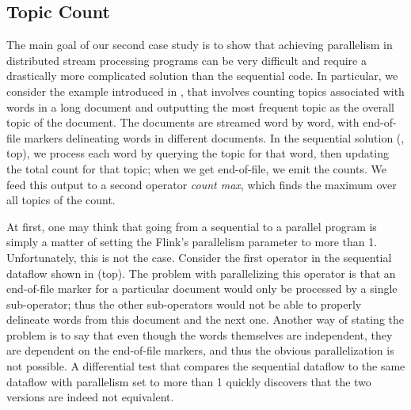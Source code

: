 \subsection{Topic Count}
\label{diffstream:ssec:evaluation-wordcount}

The main goal of our second case study is to show that achieving parallelism in distributed stream processing programs can be very difficult and require a drastically more complicated solution than the sequential code.
In particular, we consider the example introduced
in , that involves counting topics associated with words in a long document
and outputting the most frequent topic as the overall topic of the document.
The documents are streamed word by word, with end-of-file markers
delineating words in different documents.
In the sequential solution (, top), we process each word by querying the topic for that word, then updating the total count for that topic; when we get end-of-file, we emit the counts. We feed this output to a second operator \emph{count max}, which finds the maximum over all topics of the count.

At first, one may think that going from a sequential to a parallel program is
simply a matter of setting the Flink's parallelism parameter to more than 1.
Unfortunately, this is not the case. Consider the first operator in the
sequential dataflow shown in  (top). The problem with
parallelizing this operator is that an end-of-file marker for a particular
document would only be processed by a single sub-operator; thus the other
sub-operators would not be able to properly delineate words from this document
and the next one. Another way of stating the problem is to say that even
though the words themselves are independent, they are dependent on the
end-of-file markers, and thus the obvious parallelization is not possible.
A differential test that compares the sequential dataflow
to the same dataflow with parallelism set to more than 1
quickly discovers that the two versions are indeed not equivalent.

